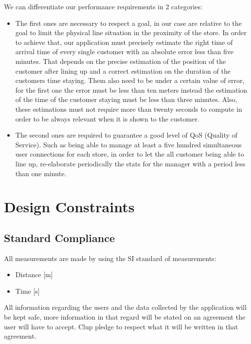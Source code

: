 We can differentiate our performance requirements in 2 categories:
\begin{itemize}
	\item The first ones are necessary to respect a goal, in our case are relative to the goal to limit the physical line situation in the proximity of the store. In 			order to achieve that, our application must precisely estimate the right time of arrival time of every single customer with an absolute error less than five 			minutes. That depends on the precise estimation of the position of the customer after lining up and a correct estimation on the duration of the customers 			time staying. Them also need to be under a certain value of error, for the first one the error must be less than ten meters instead the estimation of the time 	of the customer staying must be less than three minutes. Also, these estimations must not require more than twenty seconds to compute in order to be 			always relevant when it is shown to the customer.
	\item The second ones are required to guarantee a good level of QoS (Quality of Service). Such as being able to manage at least a five hundred  				simultaneous user connections for each store, in order to let the all customer being able to line up, re-elaborate periodically the stats for the manager with         a period less than one minute.

\end{itemize}
	

\section{Design Constraints}

\subsection{Standard Compliance}

All measurements are made by using the SI standard of measurements: 
\begin{itemize}
	\item Distance [m] \\
	\item Time [s] \\
\end{itemize} 
All information regarding the users and the data collected by the application will be kept safe, more information in that regard will be stated on an agreement the user will have to accept. Clup pledge to respect what it will be written in that agreement. \\

